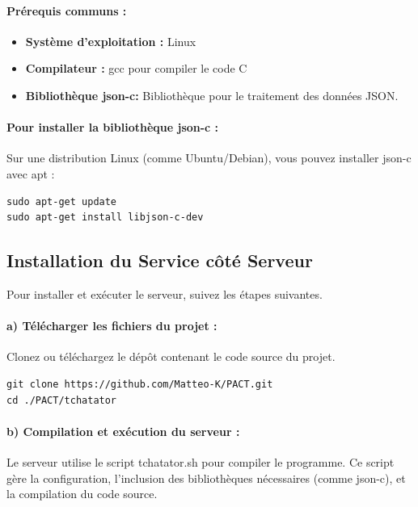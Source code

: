 \documentclass{report}
\begin{document}
\paragraph{Prérequis communs :}
\begin{itemize}

	\item \textbf{Système d'exploitation :}  Linux
	\item \textbf{Compilateur :}  gcc pour compiler le code C
	\item \textbf{Bibliothèque json-c:} Bibliothèque pour le traitement des données JSON.

\end{itemize}

\paragraph{Pour installer la bibliothèque json-c :}

Sur une distribution Linux (comme Ubuntu/Debian), vous pouvez installer json-c avec apt :

\begin{verbatim}
sudo apt-get update
sudo apt-get install libjson-c-dev
\end{verbatim}

\subsection{Installation du Service côté Serveur}

Pour installer et exécuter le serveur, suivez les étapes suivantes.

\paragraph{a) Télécharger les fichiers du projet :}

Clonez ou téléchargez le dépôt contenant le code source du projet.

\begin{verbatim}
git clone https://github.com/Matteo-K/PACT.git
cd ./PACT/tchatator
\end{verbatim}

\paragraph{b) Compilation et exécution du serveur :} Le serveur utilise le script tchatator.sh pour compiler le programme. Ce script gère la configuration, l'inclusion des bibliothèques nécessaires (comme json-c), et la compilation du code source.
\end{document}
